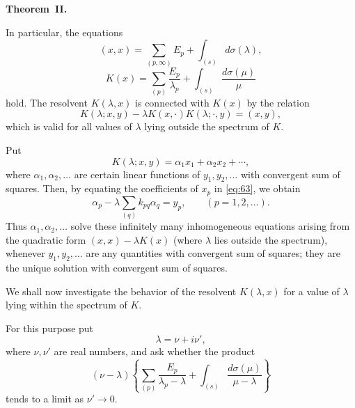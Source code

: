 \documentclass[b5paper,twoside]{article}
\makeatletter
\newcommand{\hilbertstatementname}[2]{%
  \textbf{#1\if\relax\detokenize{#2}\relax\else\ #2\fi.}%
}
\newenvironment{theorem}[1][]{%
  \par\addvspace{.7\baselineskip}%
  \phantomsection
  \protected@edef\@currentlabel{#1}%
  \noindent\hilbertstatementname{Theorem}{#1}\ \itshape\ignorespaces
}{%
  \par\addvspace{.7\baselineskip}%
}
\makeatother
\begin{document}
\begin{theorem}[II]
In particular, the equations
\begin{equation}
\tag{61}\label{eq:61}
  (x,x)=\sum_{(p,\infty)}E_p+\int_{(s)}d\sigma(\lambda),
\end{equation}
\begin{equation}
\tag{62}\label{eq:62}
  K(x)=\sum_{(p)}\frac{E_p}{\lambda_p}
       +\int_{(s)}\frac{d\sigma(\mu)}{\mu}
\end{equation}
hold.  The resolvent $K(\lambda,x)$ is connected with $K(x)$ by the relation
\begin{equation}
\tag{63}\label{eq:63}
  K(\lambda;x,y)
  -\lambda K(x,\mathord{\cdot})K(\lambda;\mathord{\cdot},y)
  =(x,y),
\end{equation}
which is valid for all values of $\lambda$ lying outside the spectrum of
$K$.
\end{theorem}

Put
\[
  K(\lambda;x,y)=\alpha_1x_1+\alpha_2x_2+\cdots,
\]
where $\alpha_1,\alpha_2,\ldots$ are certain linear functions of
$y_1,y_2,\ldots$ with convergent sum of squares.  Then, by equating the
coefficients of $x_p$ in \eqref{eq:63}, we obtain
\[
  \alpha_p-\lambda\sum_{(q)}k_{pq}\alpha_q=y_p,
  \qquad(p=1,2,\ldots).
\]
Thus $\alpha_1,\alpha_2,\ldots$ solve these infinitely many inhomogeneous
equations arising from the quadratic form $(x,x)-\lambda K(x)$ (where
$\lambda$ lies outside the spectrum), whenever $y_1,y_2,\ldots$ are any
quantities with convergent sum of squares; they are the unique solution with
convergent sum of squares.

We shall now investigate the behavior of the resolvent $K(\lambda,x)$ for a
value of $\lambda$ lying within the spectrum of $K$.

For this purpose put
\[
  \lambda=\nu+i\nu',
\]
where $\nu,\nu'$ are real numbers, and ask whether the product
\[
  (\nu-\lambda)
  \left\{
    \sum_{(p)}\frac{E_p}{\lambda_p-\lambda}
    +\int_{(s)}\frac{d\sigma(\mu)}{\mu-\lambda}
  \right\}
\]
tends to a limit as $\nu'\to0$.
\end{document}

